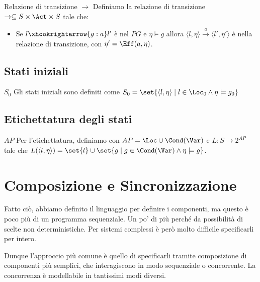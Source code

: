 \begin{definition}{Relazione di transizione \(\xrightarrow{}\)}
  Definiamo la relazione di transizione \(\xrightarrow{} \subseteq S \times \Act \times S\) tale che:
  \begin{itemize}
    \item Se \(l \xhookrightarrow{g:a} l' \) è nel \(PG\) e \(\eta \models g\) allora \(\langle l,\eta \rangle \xrightarrow{a} \langle l',\eta' \rangle\) è nella relazione di transizione, con \(\eta' = \Eff(a,\eta)\).
  \end{itemize}
\end{definition}

\subsection{Stati iniziali}

\begin{definition}{\(S_0\)}
  Gli stati iniziali sono definiti come \(S_0 = \set{\langle l, \eta \rangle \mid l \in \Loc_0 \land \eta \models g_0}\)
\end{definition}

\subsection{Etichettatura degli stati}

\begin{definition}{\(AP\)}
  Per l'etichettatura, definiamo con \(AP = \Loc \cup \Cond(\Var)\) e \(L : S \to 2^{AP}\) tale che \(L(\langle l,\eta\rangle) = \set{l} \cup \set{g \mid g \in \Cond(\Var) \land {\eta \models g}}\).
\end{definition}

\section{Composizione e Sincronizzazione}

Fatto ciò, abbiamo definito il linguaggio per definire i componenti, ma questo è poco più di un programma sequenziale. Un po' di più perché da possibilità di scelte non deterministiche.
Per sistemi complessi è però molto difficile specificarli per intero.

Dunque l'approccio più comune è quello di specificarli tramite composizione di componenti più semplici, che interagiscono in modo sequenziale o concorrente.
La concorrenza è modellabile in tantissimi modi diversi.


